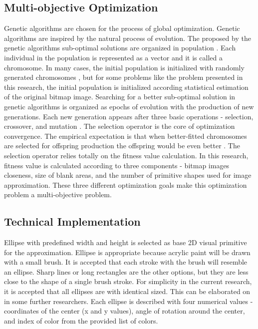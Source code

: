\documentclass[conference]{IEEEtran}
\begin{document}
\subsection{Multi-objective Optimization}

Genetic algorithms are chosen for the process of global optimization. Genetic algorithms are inspired by the natural process of evolution. The proposed by the genetic algorithms sub-optimal solutions are organized in population \cite{Balabanov-Sevova-Kolev-2019}. Each individual in the population is represented as a vector and it is called a chromosome. In many cases, the initial population is initialized with randomly generated chromosomes \cite{Balabanov-Barova-Keremedchiev-2016}, but for some problems like the problem presented in this research, the initial population is initialized according statistical estimation of the original bitmap image. Searching for a better sub-optimal solution in genetic algorithms is organized as epochs of evolution with the production of new generations. Each new generation appears after three basic operations - selection, crossover, and mutation \cite{Balabanov-Zankinski-Barova-2016}. The selection operator is the core of optimization convergence. The empirical expectation is that when better-fitted chromosomes are selected for offspring production the offspring would be even better \cite{Balabanov-Zankinski-Dobrinkova-2011}. The selection operator relies totally on the fitness value calculation. In this research, fitness value is calculated according to three components - bitmap images closeness, size of blank areas, and the number of primitive shapes used for image approximation. These three different optimization goals make this optimization problem a multi-objective problem.  

\subsection{Technical Implementation}

Ellipse with predefined width and height is selected as base 2D visual primitive for the approximation. Ellipse is appropriate because acrylic paint will be drawn with a small brush. It is accepted that each stroke with the brush will resemble an ellipse. Sharp lines or long rectangles are the other options, but they are less close to the shape of a single brush stroke. For simplicity in the current research, it is accepted that all ellipses are with identical sized. This can be elaborated on in some further researchers. Each ellipse is described with four numerical values - coordinates of the center (x and y values), angle of rotation around the center, and index of color from the provided list of colors. 
\end{document}
